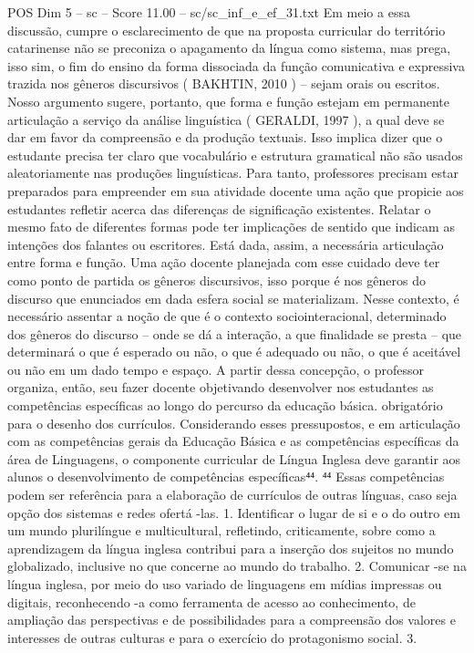 \begin{textsample}{POS Dim 5 – sc – Score 11.00 – sc/sc\_inf\_e\_ef\_31.txt}
Em meio a essa discussão, cumpre o esclarecimento de que na proposta curricular do território catarinense não se preconiza o apagamento da língua como sistema, mas prega, isso sim, o fim do ensino da forma dissociada da função comunicativa e expressiva trazida nos gêneros discursivos ( BAKHTIN, 2010 ) – sejam orais ou escritos.
Nosso argumento sugere, portanto, que forma e função estejam em permanente articulação a serviço da análise linguística ( GERALDI, 1997 ), a qual deve se dar em favor da compreensão e da produção textuais.
Isso implica dizer que o estudante precisa ter claro que vocabulário e estrutura gramatical não são usados aleatoriamente nas produções linguísticas.
Para tanto, professores precisam estar preparados para empreender em sua atividade docente uma ação que propicie aos estudantes refletir acerca das diferenças de significação existentes.
Relatar o mesmo fato de diferentes formas pode ter implicações de sentido que indicam as intenções dos falantes ou escritores.
Está dada, assim, a necessária articulação entre forma e função.
Uma ação docente planejada com esse cuidado deve ter como ponto de partida os gêneros discursivos, isso porque é nos gêneros do discurso que enunciados em dada esfera social se materializam.
Nesse contexto, é necessário assentar a noção de que é o contexto sociointeracional, determinado dos gêneros do discurso – onde se dá a interação, a que finalidade se presta – que determinará o que é esperado ou não, o que é adequado ou não, o que é aceitável ou não em um dado tempo e espaço.
A partir dessa concepção, o professor organiza, então, seu fazer docente objetivando desenvolver nos estudantes as competências específicas ao longo do percurso da educação básica. obrigatório para o desenho dos currículos.
Considerando esses pressupostos, e em articulação com as competências gerais da Educação Básica e as competências específicas da área de Linguagens, o componente curricular de Língua Inglesa deve garantir aos alunos o desenvolvimento de competências específicas⁴⁴. ⁴⁴ Essas competências podem ser referência para a elaboração de currículos de outras línguas, caso seja opção dos sistemas e redes ofertá -las. 1.
Identificar o lugar de si e o do outro em um mundo plurilíngue e multicultural, refletindo, criticamente, sobre como a aprendizagem da língua inglesa contribui para a inserção dos sujeitos no mundo globalizado, inclusive no que concerne ao mundo do trabalho. 2.
Comunicar -se na língua inglesa, por meio do uso variado de linguagens em mídias impressas ou digitais, reconhecendo -a como ferramenta de acesso ao conhecimento, de ampliação das perspectivas e de possibilidades para a compreensão dos valores e interesses de outras culturas e para o exercício do protagonismo social. 3.

\end{textsample}
